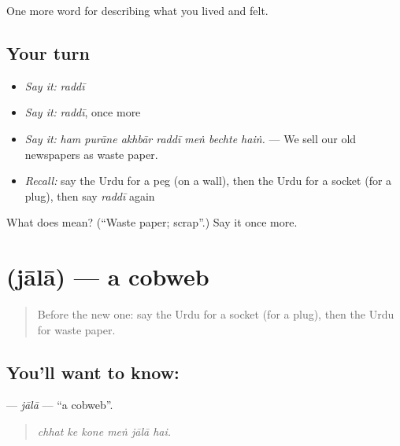 \begin{grammarlens}[title={What you've built}]
One more word for describing what you lived and felt.
\end{grammarlens}

\subsection*{Your turn}
\begin{itemize}
\raggedright
  \item \emph{Say it:} \emph{raddī}
  \item \emph{Say it:} \emph{raddī}, once more
  \item \emph{Say it:} \emph{ham purāne akhbār raddī meṅ bechte haiṅ.} — We sell our old newspapers as waste paper.
  \item \emph{Recall:} say the Urdu for a peg (on a wall), then the Urdu for a socket (for a plug), then say \emph{raddī} again
\end{itemize}

\begin{tcolorbox}[breakable,colback=teal!4,colframe=teal!35!black,title={Before you move on}]
What does  mean? (\textquotedblleft{}Waste paper; scrap\textquotedblright{}.) Say it once more.
\end{tcolorbox}
\section[\texorpdfstring{\ur{جالا} (jālā)}{جالا (jālā)}]{ (jālā) — a cobweb}

\label{lesson:UR-C505-jala}



\begin{quote}
Before the new one: say the Urdu for a socket (for a plug), then the Urdu for waste paper.
\end{quote}

\subsection*{You'll want to know: }
\textbf{} — \emph{jālā} — \textquotedblleft{}a cobweb\textquotedblright{}.

\begin{quote}
     
\end{quote}

\begin{quote}
\emph{chhat ke kone meṅ jālā hai.}
\end{quote}

